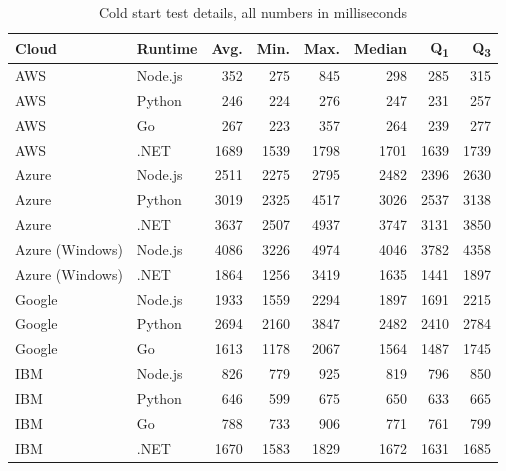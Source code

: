 \begin{table}[h]
    \centering
    \begin{tabular}{|l|l|r|r|r|r|r|r|} \hline
\textbf{Cloud}	&	\textbf{Runtime}	&	\textbf{Avg.}	&	\textbf{Min.}	&	\textbf{Max.}	&	\textbf{Median}	&	\textbf{Q\textsubscript{1}}	&	\textbf{Q\textsubscript{3}}	\\ \hline
AWS	&	Node.js	&	352	&	275	&	845	&	298	&	285	&	315	\\ \hline
AWS	&	Python	&	246	&	224	&	276	&	247	&	231	&	257	\\ \hline
AWS	&	Go	&	267	&	223	&	357	&	264	&	239	&	277	\\ \hline
AWS	&	.NET	&	1689	&	1539	&	1798	&	1701	&	1639	&	1739	\\ \hline
Azure	&	Node.js	&	2511	&	2275	&	2795	&	2482	&	2396	&	2630	\\ \hline
Azure	&	Python	&	3019	&	2325	&	4517	&	3026	&	2537	&	3138	\\ \hline
Azure	&	.NET	&	3637	&	2507	&	4937	&	3747	&	3131	&	3850	\\ \hline
Azure (Windows)	&	Node.js	&	4086	&	3226	&	4974	&	4046	&	3782	&	4358	\\ \hline
Azure (Windows)	&	.NET	&	1864	&	1256	&	3419	&	1635	&	1441	&	1897	\\ \hline
Google	&	Node.js	&	1933	&	1559	&	2294	&	1897	&	1691	&	2215	\\ \hline
Google	&	Python	&	2694	&	2160	&	3847	&	2482	&	2410	&	2784	\\ \hline
Google	&	Go	&	1613	&	1178	&	2067	&	1564	&	1487	&	1745	\\ \hline
IBM	&	Node.js	&	826	&	779	&	925	&	819	&	796	&	850	\\ \hline
IBM	&	Python	&	646	&	599	&	675	&	650	&	633	&	665	\\ \hline
IBM	&	Go	&	788	&	733	&	906	&	771	&	761	&	799	\\ \hline
IBM	&	.NET	&	1670	&	1583	&	1829	&	1672	&	1631	&	1685	\\ \hline
\end{tabular}
    \caption[Cold start test details]{Cold start test details, all numbers in milliseconds}
    \label{tab:latency}
\end{table}

